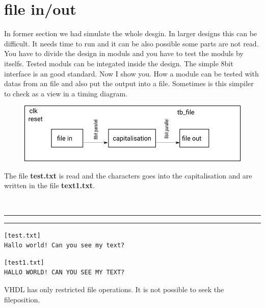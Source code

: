 \documentclass[a4paper,11pt]{article}
\begin{document}
\section{file in/out}
In former section we had simulate the whole desgin. In larger designs this can be difficult. It needs time to run and it can be also possible some parts are not read. You have to divide the design in moduls and you have to test the moduls by itselfs. Tested moduls can be integated inside the design. The simple 8bit interface is an good standard. Now I show you. How a module can be tested with datas from an file and also put the output into a file. Sometimes is this simpiler to check as a view in a timing diagram. 
\begin{figure}[H]
  \begin{center}
    \includegraphics[scale=0.4]{file_in_out/zeichnung.png}
  \end{center}
\end{figure}
The file \textbf{test.txt} is read and the characters  goes into the capitalisation and are written in the file \textbf{text1.txt}. 

\vspace{10pt}
\\
\hrule

\hrule
\vspace{10pt}

\begin{verbatim}
[test.txt]
Hallo world! Can you see my text?
\end{verbatim}

\begin{verbatim}
[test1.txt]
HALLO WORLD! CAN YOU SEE MY TEXT?
\end{verbatim}
VHDL has only restricted file operations. It is not possible to seek the fileposition.
\end{document}
